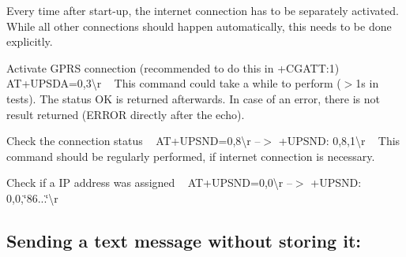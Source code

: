 Every time after start-\/up, the internet connection has to be separately activated. While all other connections should happen automatically, this needs to be done explicitly.
\begin{DoxyEnumerate}
\item Activate G\+P\+RS connection (recommended to do this in +\+C\+G\+A\+TT\+:1)~\newline
 {\ttfamily A\+T+\+U\+P\+S\+DA=0,3\textbackslash{}r} ~\newline
 This command could take a while to perform ($>$1s in tests). The status OK is returned afterwards. In case of an error, there is not result returned (E\+R\+R\+OR directly after the echo). ~\newline

\end{DoxyEnumerate}
\begin{DoxyEnumerate}
\item Check the connection status ~\newline
 {\ttfamily A\+T+\+U\+P\+S\+ND=0,8\textbackslash{}r} --$>$ {\ttfamily +\+U\+P\+S\+ND\+: 0,8,1\textbackslash{}r} ~\newline
 This command should be regularly performed, if internet connection is necessary.
\end{DoxyEnumerate}
\begin{DoxyEnumerate}
\item Check if a IP address was assigned ~\newline
 {\ttfamily A\+T+\+U\+P\+S\+ND=0,0\textbackslash{}r} --$>$ {\ttfamily +\+U\+P\+S\+ND\+: 0,0,\char`\"{}86...\char`\"{}\textbackslash{}r}
\end{DoxyEnumerate}

\subsection*{Sending a text message without storing it\+:}


